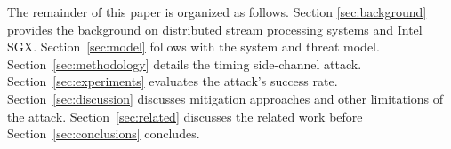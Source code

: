 The remainder of this paper is organized as follows. Section \ref{sec:background} provides the background on distributed
stream processing systems and Intel SGX. Section~\ref{sec:model} follows with the system and threat model.
Section~\ref{sec:methodology} details the timing side-channel attack. Section~\ref{sec:experiments} evaluates the
attack's success rate. Section~\ref{sec:discussion} discusses mitigation approaches and other limitations of the attack.
Section~\ref{sec:related} discusses the related work before Section~\ref{sec:conclusions} concludes.






